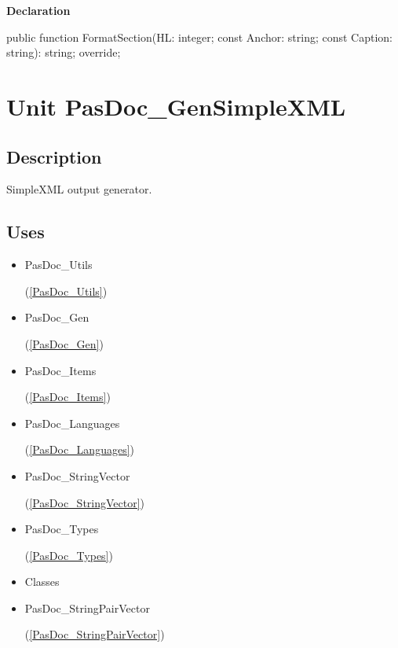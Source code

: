 \documentclass{report}
\newif\ifpdf
\begin{document}
\label{PasDoc_GenLatex.TTexDocGenerator-FormatSection}
\begin{list}{}{
\setlength{\itemindent}{0cm}
\setlength{\listparindent}{0cm}
\setlength{\leftmargin}{\evensidemargin}
\addtolength{\leftmargin}{\tmplength}
\settowidth{\labelsep}{X}
\addtolength{\leftmargin}{\labelsep}
\setlength{\labelwidth}{\tmplength}
}
\item[\textbf{Declaration}\hfill]
\ifpdf
\begin{flushleft}
\fi
\begin{ttfamily}
public function FormatSection(HL: integer; const Anchor: string; const Caption: string): string; override;\end{ttfamily}

\ifpdf
\end{flushleft}
\fi

\end{list}
\chapter{Unit PasDoc{\_}GenSimpleXML}
\label{PasDoc_GenSimpleXML}
\section{Description}
SimpleXML output generator.
\section{Uses}
\begin{itemize}
\item \begin{ttfamily}PasDoc{\_}Utils\end{ttfamily}(\ref{PasDoc_Utils})\item \begin{ttfamily}PasDoc{\_}Gen\end{ttfamily}(\ref{PasDoc_Gen})\item \begin{ttfamily}PasDoc{\_}Items\end{ttfamily}(\ref{PasDoc_Items})\item \begin{ttfamily}PasDoc{\_}Languages\end{ttfamily}(\ref{PasDoc_Languages})\item \begin{ttfamily}PasDoc{\_}StringVector\end{ttfamily}(\ref{PasDoc_StringVector})\item \begin{ttfamily}PasDoc{\_}Types\end{ttfamily}(\ref{PasDoc_Types})\item \begin{ttfamily}Classes\end{ttfamily}\item \begin{ttfamily}PasDoc{\_}StringPairVector\end{ttfamily}(\ref{PasDoc_StringPairVector})\end{itemize}
\end{document}
